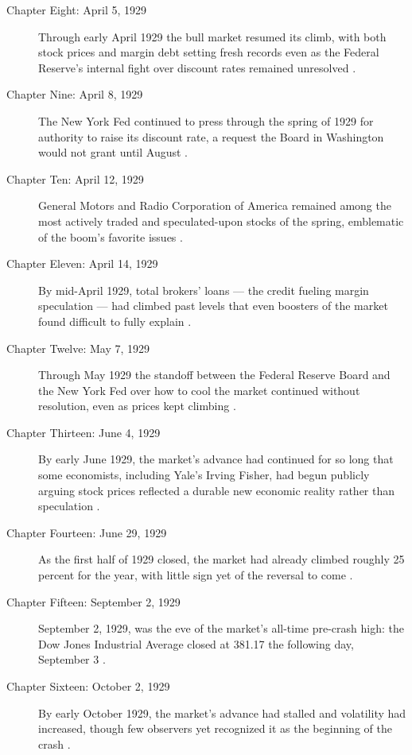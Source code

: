 \documentclass[11pt]{article}
\begin{document}
\begin{description}
\item[Chapter Eight: April 5, 1929] Through early April 1929 the bull market
resumed its climb, with both stock prices and margin debt setting fresh
records even as the Federal Reserve's internal fight over discount rates
remained unresolved \autocite{fedhistorycrash}.

\item[Chapter Nine: April 8, 1929] The New York Fed continued to press through
the spring of 1929 for authority to raise its discount rate, a request the
Board in Washington would not grant until August \autocite{fedhistorycrash}.

\item[Chapter Ten: April 12, 1929] General Motors and Radio Corporation of
America remained among the most actively traded and speculated-upon stocks of
the spring, emblematic of the boom's favorite issues \autocite{crashwiki}.

\item[Chapter Eleven: April 14, 1929] By mid-April 1929, total brokers' loans
--- the credit fueling margin speculation --- had climbed past levels that
even boosters of the market found difficult to fully explain
\autocite{fedhistorycrash}.

\item[Chapter Twelve: May 7, 1929] Through May 1929 the standoff between the
Federal Reserve Board and the New York Fed over how to cool the market
continued without resolution, even as prices kept climbing
\autocite{fedhistorycrash}.

\item[Chapter Thirteen: June 4, 1929] By early June 1929, the market's advance
had continued for so long that some economists, including Yale's Irving
Fisher, had begun publicly arguing stock prices reflected a durable new
economic reality rather than speculation \autocite{crashwiki}.

\item[Chapter Fourteen: June 29, 1929] As the first half of 1929 closed, the
market had already climbed roughly 25 percent for the year, with little sign
yet of the reversal to come \autocite{crashwiki}.

\item[Chapter Fifteen: September 2, 1929] September 2, 1929, was the eve of
the market's all-time pre-crash high: the Dow Jones Industrial Average closed
at 381.17 the following day, September 3 \autocite{crashwiki}.

\item[Chapter Sixteen: October 2, 1929] By early October 1929, the market's
advance had stalled and volatility had increased, though few observers yet
recognized it as the beginning of the crash \autocite{crashwiki}.


\end{description}
\end{document}
